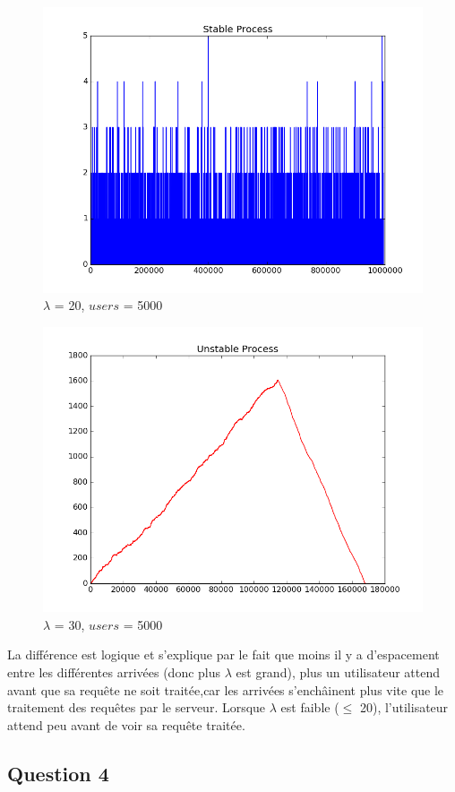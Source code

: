 \documentclass[12pt]{article}
\begin{document}
\begin{figure}[H]
\centering
\includegraphics[scale=0.50]{stableprocessquestion3.png}
\caption{\label{fig:rf_taille_noeud} $\lambda$ = 20, $users$ = 5000}
\end{figure}

\begin{figure}[H]
\centering
\includegraphics[scale=0.50]{unstableprocessquestion3.png}
\caption{\label{fig:rf_taille_noeud} $\lambda$ = 30, $users$ = 5000}
\end{figure}

La différence est logique et s'explique par le fait que moins il y a d'espacement entre les différentes arrivées (donc plus $\lambda$ est grand), plus un utilisateur attend avant que sa requête ne soit traitée,car les arrivées s'enchâinent plus vite que le traitement des requêtes par le serveur. Lorsque $\lambda$ est faible ($\leq$ 20), l'utilisateur attend peu avant de voir sa requête traitée.\\

\subsection{Question 4}




 
\end{document}
